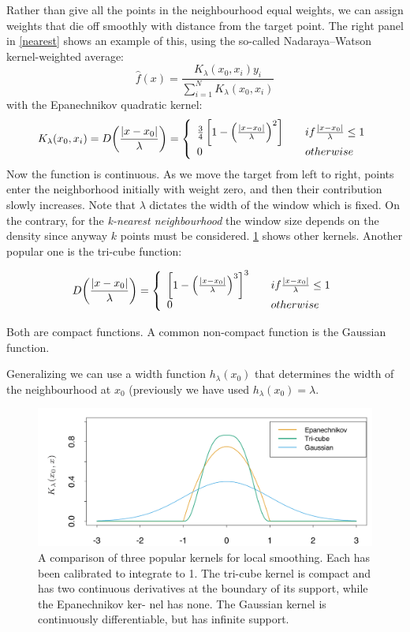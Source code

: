 \documentclass[12pt, letterpaper]{article}
\theoremstyle{definition}
\DeclarePairedDelimiter\autobracket{(}{)}
\newcommand{\br}[1]{\autobracket*{#1}}
\begin{document}
Rather than give all the points in the neighbourhood equal weights, we can assign weights that die off smoothly with distance from the target point. The right panel in \ref{nearest} shows an example of this, using the so-called Nadaraya–Watson kernel-weighted average:
\begin{equation}
\hat{f}(x) = \frac{K_\lambda(x_0, x_i)y_i}{\sum_{i=1}^N K_\lambda(x_0, x_i)}
\end{equation}
with the Epanechnikov quadratic kernel:
\begin{equation}
K_\lambda(x_0, x_i)= D\br{\frac{|x-x_0|}{\lambda}} = \left\{ \begin{array}{ll}  \frac{3}{4}\left[1-\left(\frac{|x-x_0|}{\lambda} \right)^2 \right]&\quad if \frac{|x-x_0|}{\lambda}\le 1\\
0 &\quad otherwise
\end{array}
 \right.
\end{equation}
Now the function is continuous. As we move the target from left to right, points enter the neighborhood initially with weight zero, and then their contribution slowly increases. Note that $\lambda$ dictates the width of the window which is fixed. On the contrary, for the \textit{k-nearest neighbourhood} the window size depends on the density since anyway $k$ points must be considered. \ref{kernels} shows other kernels. Another popular one is the tri-cube function:

\begin{equation}
 D\br{\frac{|x-x_0|}{\lambda}} = \left\{ \begin{array}{ll}  \left[1-\left(\frac{|x-x_0|}{\lambda} \right)^3 \right]^3&\quad if \frac{|x-x_0|}{\lambda}\le 1\\
0 &\quad otherwise
\end{array}
 \right.
\end{equation}

Both are compact functions. A common non-compact function is the Gaussian function.

Generalizing we can use a width function $h_\lambda(x_0)$ that determines the width of the neighbourhood at $x_0$ (previously we have used $h_\lambda(x_0) = \lambda$.

\begin{figure}
\centering
\includegraphics[scale=0.4]{img/kernels}
\caption{A comparison of three popular kernels for local smoothing. Each has been calibrated to integrate to 1. The tri-cube kernel is compact and has two continuous derivatives at the boundary of its support, while the Epanechnikov ker- nel has none. The Gaussian kernel is continuously differentiable, but has infinite support.}
\label{kernels}
\end{figure}
\end{document}
